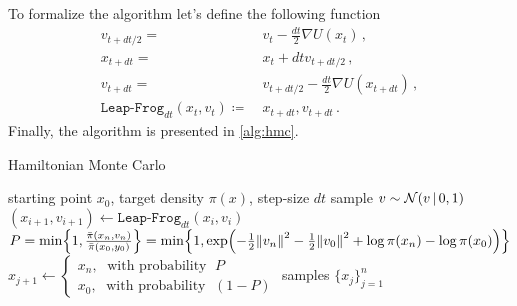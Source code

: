 To formalize the algorithm let's define the following function
\begin{align}
    v_{t+dt/2} =~& v_t - \frac{dt}{2}\nabla U(x_t)\,,\\
    x_{t+dt} =~& x_t + dtv_{t+dt/2}\,,\\
    v_{t+dt} =~& v_{t+dt/2} - \frac{dt}{2}\nabla U(x_{t+dt})\,,\\
    \texttt{Leap-Frog}_{dt}(x_t,v_t) \coloneqq ~& x_{t+dt},v_{t+dt}\,.
\end{align}
Finally, the algorithm is presented in \cref{alg:hmc}.

\begin{algorithm}[t]
\caption{Hamiltonian Monte Carlo}\label{alg:hmc}
\begin{algorithmic}
\REQUIRE starting point $x_0$, target density $\pi(x)$, step-size $dt$
\FOR{iterations $j \in [0,n)$}
\STATE sample $v \sim \mathcal{N}(v\,|\, 0,1)$
\FOR{$i \in [0,n)$}
    \STATE $(x_{i+1},v_{i+1}) \gets \texttt{Leap-Frog}_{dt}(x_i,v_i)$
\ENDFOR
\STATE $P = \min\left\{1,\frac{\bar{\pi}(x_n,v_n)}{\bar{\pi}(x_0,y_0)}\right\} = \min\left\{1,\exp\left(-\frac{1}{2}\norm{v_n}^2-\frac{1}{2}\norm{v_0}^2 +\log\pi(x_n) - \log\pi(x_0)\right)\right\}$
\STATE $x_{j+1} \gets \begin{cases} x_n, \;\text{ with probability }\; P\\
        x_0, \;\text{ with probability }\; (1-P)\end{cases}$
\ENDFOR
\RETURN samples $\{x_j\}_{j=1}^n$
\end{algorithmic}
\end{algorithm}
